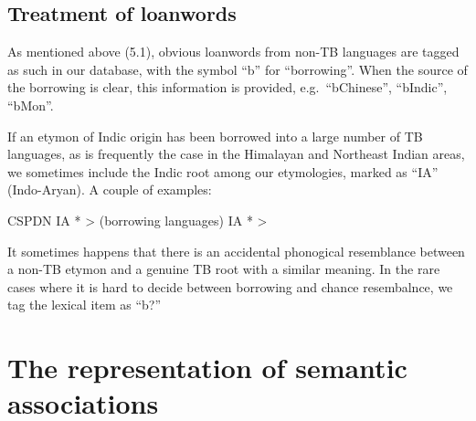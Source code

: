 


\subsection{Treatment of loanwords}

As mentioned above (5.1), obvious loanwords from non-TB languages are tagged as such in our database, with the symbol “b” for “borrowing”. When the source of the borrowing is clear, this information is provided, e.g.\ “bChinese”, “bIndic”, “bMon”.

If an etymon of Indic origin has been borrowed into a large number of TB languages, as is frequently the case in the Himalayan and Northeast Indian areas, we sometimes include the Indic root among our etymologies, marked as “IA” (Indo-Aryan).
A couple of examples:

CSPDN
IA *	> (borrowing languages)
IA *	>

It sometimes happens that there is an accidental phonogical resemblance between a non-TB etymon and a genuine TB root with a similar meaning. In the rare cases where it is hard to decide between borrowing and chance resembalnce, we tag the lexical item as “b?”

\section{The representation of semantic associations}

